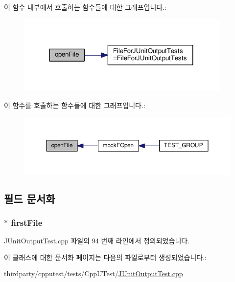 이 함수 내부에서 호출하는 함수들에 대한 그래프입니다.\+:
\nopagebreak
\begin{figure}[H]
\begin{center}
\leavevmode
\includegraphics[width=299pt]{class_file_system_for_j_unit_test_output_tests_a3741467803cff9a7f468f7f212a4604c_cgraph}
\end{center}
\end{figure}




이 함수를 호출하는 함수들에 대한 그래프입니다.\+:
\nopagebreak
\begin{figure}[H]
\begin{center}
\leavevmode
\includegraphics[width=350pt]{class_file_system_for_j_unit_test_output_tests_a3741467803cff9a7f468f7f212a4604c_icgraph}
\end{center}
\end{figure}




\subsection{필드 문서화}
\subsubsection[{\texorpdfstring{first\+File\+\_\+}{firstFile_}}]{$\ast$ first\+File\+\_\+\hspace{0.3cm}{\ttfamily [private]}}\hypertarget{class_file_system_for_j_unit_test_output_tests_a1d618aef04cf9f6e25e51b7a2ee42db0}{}\label{class_file_system_for_j_unit_test_output_tests_a1d618aef04cf9f6e25e51b7a2ee42db0}


J\+Unit\+Output\+Test.\+cpp 파일의 94 번째 라인에서 정의되었습니다.



이 클래스에 대한 문서화 페이지는 다음의 파일로부터 생성되었습니다.\+:\begin{DoxyCompactItemize}
\item 
thirdparty/cpputest/tests/\+Cpp\+U\+Test/\hyperlink{_j_unit_output_test_8cpp}{J\+Unit\+Output\+Test.\+cpp}\end{DoxyCompactItemize}
